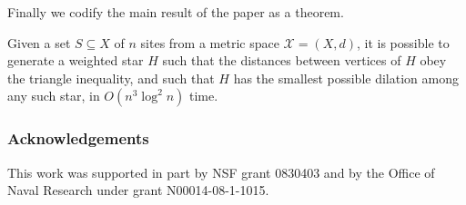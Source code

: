 \documentclass{llncs}
\begin{document}
Finally we codify the main result of the paper as a theorem.

\begin{theorem}
Given a set $S \subseteq X$ of $n$ sites from a metric space $\mathcal{X} = (X,d)$, it is possible to generate a weighted star $H$ such that the distances between vertices of $H$ obey the triangle inequality, and such that $H$ has the smallest possible dilation among any such star, in $O(n^3 \log^2 n)$ time.
\end{theorem}


\subsubsection*{Acknowledgements}

This work was supported in part by NSF grant
0830403 and by the Office of Naval Research under grant
N00014-08-1-1015.

\small\raggedright
 
\end{document}
